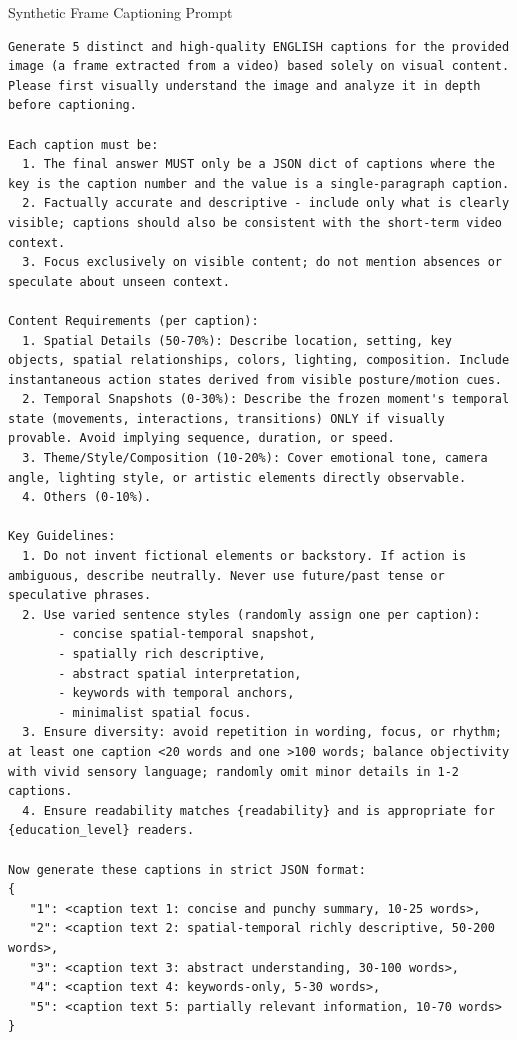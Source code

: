 \begin{promptbox}{Synthetic Frame Captioning Prompt}
\begin{lstlisting}[style=promptstyle]
Generate 5 distinct and high-quality ENGLISH captions for the provided image (a frame extracted from a video) based solely on visual content. Please first visually understand the image and analyze it in depth before captioning.

Each caption must be:
  1. The final answer MUST only be a JSON dict of captions where the key is the caption number and the value is a single-paragraph caption.
  2. Factually accurate and descriptive - include only what is clearly visible; captions should also be consistent with the short-term video context.
  3. Focus exclusively on visible content; do not mention absences or speculate about unseen context.

Content Requirements (per caption):
  1. Spatial Details (50-70%): Describe location, setting, key objects, spatial relationships, colors, lighting, composition. Include instantaneous action states derived from visible posture/motion cues.
  2. Temporal Snapshots (0-30%): Describe the frozen moment's temporal state (movements, interactions, transitions) ONLY if visually provable. Avoid implying sequence, duration, or speed.
  3. Theme/Style/Composition (10-20%): Cover emotional tone, camera angle, lighting style, or artistic elements directly observable.
  4. Others (0-10%).

Key Guidelines:
  1. Do not invent fictional elements or backstory. If action is ambiguous, describe neutrally. Never use future/past tense or speculative phrases.
  2. Use varied sentence styles (randomly assign one per caption):
       - concise spatial-temporal snapshot,
       - spatially rich descriptive,
       - abstract spatial interpretation,
       - keywords with temporal anchors,
       - minimalist spatial focus.
  3. Ensure diversity: avoid repetition in wording, focus, or rhythm; at least one caption <20 words and one >100 words; balance objectivity with vivid sensory language; randomly omit minor details in 1-2 captions.
  4. Ensure readability matches {readability} and is appropriate for {education_level} readers.

Now generate these captions in strict JSON format:
{
   "1": <caption text 1: concise and punchy summary, 10-25 words>,
   "2": <caption text 2: spatial-temporal richly descriptive, 50-200 words>,
   "3": <caption text 3: abstract understanding, 30-100 words>,
   "4": <caption text 4: keywords-only, 5-30 words>,
   "5": <caption text 5: partially relevant information, 10-70 words>
}
\end{lstlisting}
\end{promptbox}

